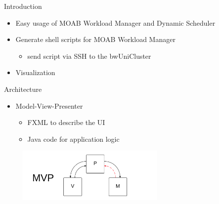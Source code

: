 
	\begin{frame}{Introduction}
		\begin{itemize}
			\pause
			\item Easy usage of MOAB Workload Manager and Dynamic Scheduler
			\pause
			\item Generate shell scripts for MOAB Workload Manager 
			\begin{itemize}
				\pause
				\item  send script via SSH to the bwUniCluster
			\end{itemize}
			\pause
			\item Visualization
			
		\end{itemize}
	\end{frame}
	
	\begin{frame}{Architecture}
		\begin{itemize}
	\pause
			\item Model-View-Presenter
			\begin{itemize}
				\pause
				\item FXML to describe the UI
				\pause
				\item Java code for application logic
			\end{itemize}
	        
				\includegraphics[width=300px, height=100px]{images/mvp.png}
		\end{itemize}
	\end{frame}
	
	
	

